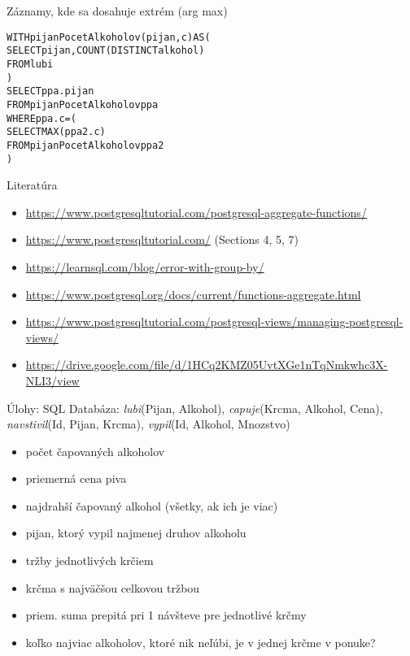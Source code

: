 \documentclass[12pt]{beamer}
\def\blue#1{\textcolor{Cerulean}{#1}}
\begin{document}
\begin{frame}[fragile]{Záznamy, kde sa dosahuje extrém (arg max)}
\begin{alltt}
\alert{WITH} \blue{pijanPocetAlkoholov}(pijan, c) AS (
    SELECT pijan, COUNT(DISTINCT alkohol)
    FROM lubi
)
SELECT ppa.pijan
FROM \blue{pijanPocetAlkoholov} ppa
WHERE ppa.c = (
    SELECT MAX(ppa2.c)
    FROM \blue{pijanPocetAlkoholov} ppa2
)
\end{alltt}
\bigskip
\end{frame}


\begin{frame}{Literatúra}
\begin{itemize}
\item {\scriptsize\url{https://www.postgresqltutorial.com/postgresql-aggregate-functions/}}
\item {\scriptsize\url{https://www.postgresqltutorial.com/} (Sections 4, 5, 7)}
\item {\scriptsize\url{https://learnsql.com/blog/error-with-group-by/}}
\item {\scriptsize\url{https://www.postgresql.org/docs/current/functions-aggregate.html}}
\item {\scriptsize\url{https://www.postgresqltutorial.com/postgresql-views/managing-postgresql-views/}}
\item {\scriptsize\url{https://drive.google.com/file/d/1HCq2KMZ05UvtXGe1nTqNmkwhc3X-NLI3/view}}
\end{itemize}
\end{frame}


\begin{frame}{Úlohy: SQL}
Databáza: \emph{lubi}(Pijan, Alkohol), \emph{capuje}(Krcma, Alkohol, Cena),
\emph{navstivil}(Id, Pijan, Krcma), \emph{vypil}(Id, Alkohol, Mnozstvo)
\begin{itemize}
	\item počet čapovaných alkoholov
	\item priemerná cena piva
	\item najdrahší čapovaný alkohol (všetky, ak ich je viac)
    \item pijan, ktorý vypil najmenej druhov alkoholu
	\item tržby jednotlivých krčiem
    \item krčma s najväčšou celkovou tržbou
    \item priem. suma prepitá pri 1 návšteve pre jednotlivé krčmy
    \item koľko najviac alkoholov, ktoré nik neľúbi, je v jednej krčme v ponuke?
\end{itemize}
\end{frame}
\end{document}
